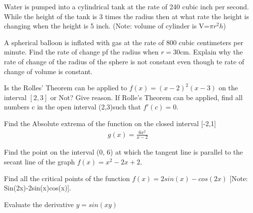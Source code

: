 \documentclass[11pt]{exam}
\begin{document}
\begin{questions}
\newpage
\addpoints
\question[15] 


\noaddpoints %

\newpage

\addpoints
\question[10] Water is pumped into a cylindrical tank at the rate of 240 cubic inch per second. While the height of the tank is 3 times the radius then at what rate the height is changing when the height is 5 inch. (Note: volume of cylinder is V=$\pi r^2 h$)



\vspace{8cm}
\addpoints
\question[13] A spherical balloon is inflated with gas at the rate of 800 cubic centimeters per minute. Find the rate of change pf the radius when $r=30$cm. Explain why the rate of change of the radius of the sphere is not constant even though te rate of change of volume is constant.



\vspace{8cm}
\newpage
\addpoints
\question[10] Is the Rolles' Theorem can be applied to $f(x)=(x-2)^2(x-3)$  on the interval $[2,3]$ or Not? Give reason.  If Rolle's Theorem can be applied, find all numbers c in the open interval (2,3)such that $f'(c)=0$.


\vspace{9cm}
\addpoints
\question[10]Find the Absolute extrema of the function on the closed interval [-2,1]
\begin{align*}
g(x)=\frac{6x^2}{x-2}
\end{align*}

\newpage
\addpoints
\question[10] Find the point on the interval (0, 6) at which the tangent line is parallel to the secant line of the graph $f(x)=x^2-2x+2$.


\vspace{8cm}
\addpoints
\question[10] Find all the critical points of the function $f(x)=2sin(x)-cos(2x)$ [Note: Sin(2x)-2sin(x)cos(x)].


\vspace{8cm}
\addpoints
\question[5 Bonus] Evaluate the derivative $y=sin(xy)$
\end{questions}
\end{document}
